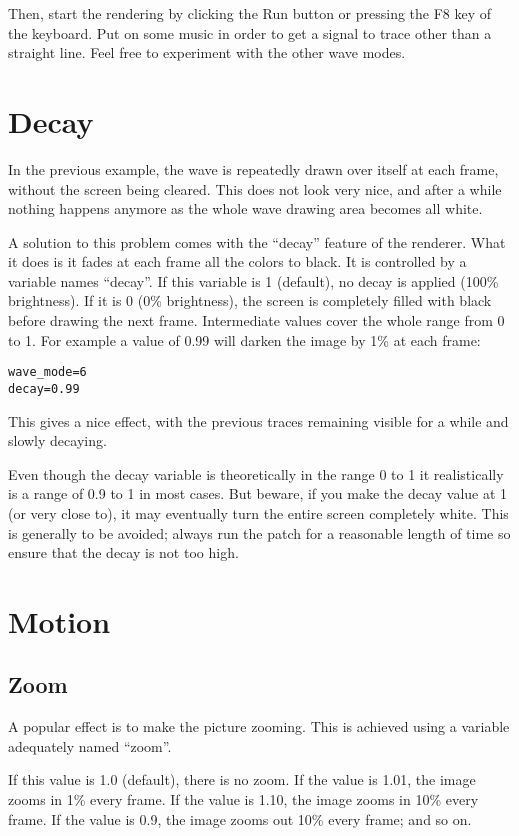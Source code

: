 \documentclass[11pt, a5paper, pagesize]{scrbook}
\begin{document}
Then, start the rendering by clicking the Run button or pressing the F8 key of the keyboard. Put on some music in order to get a signal to trace other than a straight line. Feel free to experiment with the other wave modes.

\section{Decay}
In the previous example, the wave is repeatedly drawn over itself at each frame, without the screen being cleared. This does not look very nice, and after a while nothing happens anymore as the whole wave drawing area becomes all white.

A solution to this problem comes with the ``decay'' feature of the renderer. What it does is it fades at each frame all the colors to black. It is controlled by a variable names ``decay''. If this variable is 1 (default), no decay is applied (100\% brightness). If it is 0 (0\% brightness), the screen is completely filled with black before drawing the next frame. Intermediate values cover the whole range from 0 to 1. For example a value of 0.99 will darken the image by 1\% at each frame:

\begin{verbatim}
wave_mode=6
decay=0.99
\end{verbatim}


This gives a nice effect, with the previous traces remaining visible for a while and slowly decaying.

Even though the decay variable is theoretically in the range 0 to 1 it realistically is a range of 0.9 to 1 in most cases. But beware, if you make the decay value at 1 (or very close to), it may eventually turn the entire screen completely white. This is generally to be avoided; always run the patch for a reasonable length of time so ensure that the decay is not too high.

\section{Motion}
\subsection{Zoom}
A popular effect is to make the picture zooming. This is achieved using a variable adequately named ``zoom''.

If this value is 1.0 (default), there is no zoom. If the value is 1.01, the image zooms in 1\% every frame. If the value is 1.10, the image zooms in 10\% every frame. If the value is 0.9, the image zooms out 10\% every frame; and so on.
\end{document}
